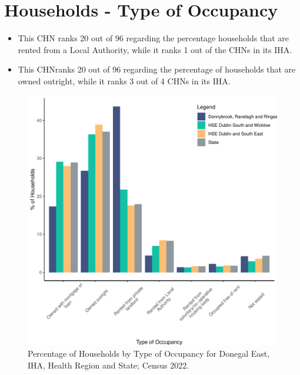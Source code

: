 \documentclass{article}
\begin{document}
\section{Households - Type of Occupancy}\label{sect:Households}
\begin{itemize}
\item This CHN ranks  20 out of 96 regarding the percentage households that are rented from a Local Authority, while it ranks  1 out of the CHNs in its IHA. 
\item This CHNranks  20 out of 96 regarding the percentage of households that are owned outright, while it ranks   3 out of 4 CHNs in its IHA.
\end{itemize}
\begin{figure}[H]
	\centering
	\includegraphics[width = 140mm]{../figures/HouseholdsED.pdf}
	\caption{Percentage of Households by Type of Occupancy for Donegal East, IHA, Health Region and State; Census 2022.}
	\label{fig:vbnv}
	\end{figure}
\end{document}
